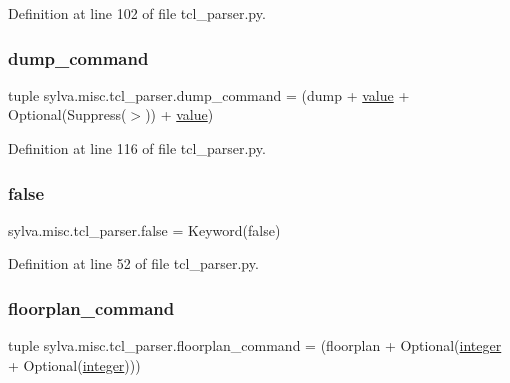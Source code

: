 Definition at line 102 of file tcl\+\_\+parser.\+py.

\mbox{\label{namespacesylva_1_1misc_1_1tcl__parser_ad63aacf8188d9604a6876b638b975522}} 
\subsubsection{\texorpdfstring{dump\+\_\+command}{dump\_command}}
{\footnotesize\ttfamily tuple sylva.\+misc.\+tcl\+\_\+parser.\+dump\+\_\+command = (dump + \hyperlink{namespacesylva_1_1misc_1_1tcl__parser_a83a1a4d978bc1a8a1bd92f71b754bad9}{value} + Optional(Suppress(\textquotesingle{}$>$\textquotesingle{})) + \hyperlink{namespacesylva_1_1misc_1_1tcl__parser_a83a1a4d978bc1a8a1bd92f71b754bad9}{value})}



Definition at line 116 of file tcl\+\_\+parser.\+py.

\mbox{\label{namespacesylva_1_1misc_1_1tcl__parser_afd24314ff35451e53749e5b88bfded24}} 
\subsubsection{\texorpdfstring{false}{false}}
{\footnotesize\ttfamily sylva.\+misc.\+tcl\+\_\+parser.\+false = Keyword(\textquotesingle{}false\textquotesingle{})}



Definition at line 52 of file tcl\+\_\+parser.\+py.

\mbox{\label{namespacesylva_1_1misc_1_1tcl__parser_a9dd05ec51936992522cb2776147d6794}} 
\subsubsection{\texorpdfstring{floorplan\+\_\+command}{floorplan\_command}}
{\footnotesize\ttfamily tuple sylva.\+misc.\+tcl\+\_\+parser.\+floorplan\+\_\+command = (floorplan + Optional(\hyperlink{namespacesylva_1_1misc_1_1tcl__parser_aaa6da6af48cbfc02e2f6edd078ea16ab}{integer} + Optional(\hyperlink{namespacesylva_1_1misc_1_1tcl__parser_aaa6da6af48cbfc02e2f6edd078ea16ab}{integer})))}




